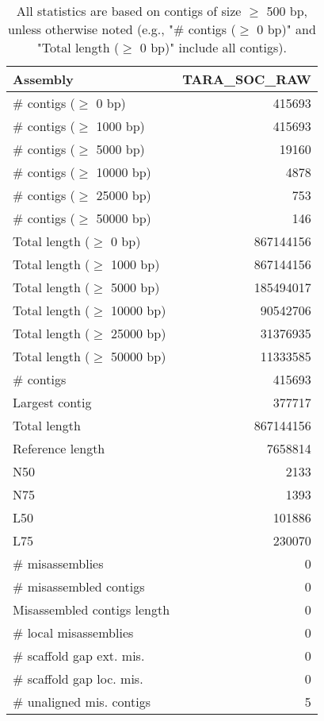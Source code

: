 \documentclass[12pt,a4paper]{article}
\begin{document}
\begin{table}[ht]
\begin{center}
\caption{All statistics are based on contigs of size $\geq$ 500 bp, unless otherwise noted (e.g., "\# contigs ($\geq$ 0 bp)" and "Total length ($\geq$ 0 bp)" include all contigs).}
\begin{tabular}{|l*{1}{|r}|}
\hline
Assembly & TARA\_SOC\_RAW \\ \hline
\# contigs ($\geq$ 0 bp) & 415693 \\ \hline
\# contigs ($\geq$ 1000 bp) & 415693 \\ \hline
\# contigs ($\geq$ 5000 bp) & 19160 \\ \hline
\# contigs ($\geq$ 10000 bp) & 4878 \\ \hline
\# contigs ($\geq$ 25000 bp) & 753 \\ \hline
\# contigs ($\geq$ 50000 bp) & 146 \\ \hline
Total length ($\geq$ 0 bp) & 867144156 \\ \hline
Total length ($\geq$ 1000 bp) & 867144156 \\ \hline
Total length ($\geq$ 5000 bp) & 185494017 \\ \hline
Total length ($\geq$ 10000 bp) & 90542706 \\ \hline
Total length ($\geq$ 25000 bp) & 31376935 \\ \hline
Total length ($\geq$ 50000 bp) & 11333585 \\ \hline
\# contigs & 415693 \\ \hline
Largest contig & 377717 \\ \hline
Total length & 867144156 \\ \hline
Reference length & 7658814 \\ \hline
N50 & 2133 \\ \hline
N75 & 1393 \\ \hline
L50 & 101886 \\ \hline
L75 & 230070 \\ \hline
\# misassemblies & 0 \\ \hline
\# misassembled contigs & 0 \\ \hline
Misassembled contigs length & 0 \\ \hline
\# local misassemblies & 0 \\ \hline
\# scaffold gap ext. mis. & 0 \\ \hline
\# scaffold gap loc. mis. & 0 \\ \hline
\# unaligned mis. contigs & 5 \\ \hline

\end{tabular}
\end{center}
\end{table}
\end{document}
